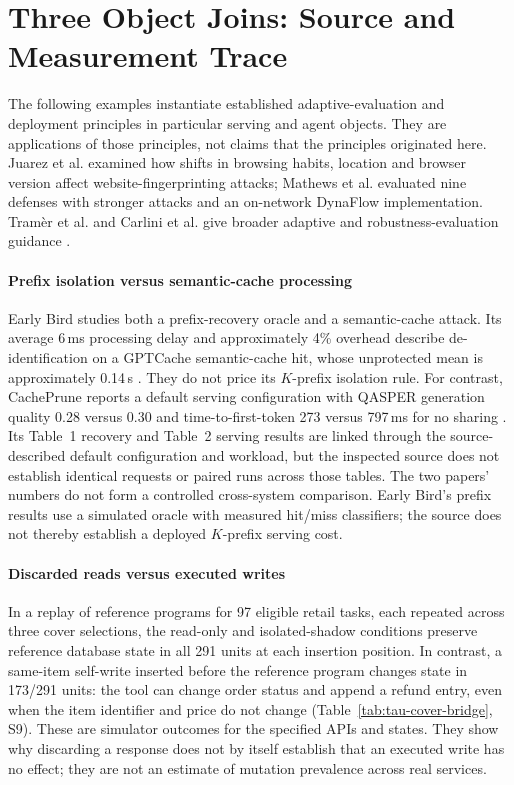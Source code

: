 \section{Three Object Joins: Source and Measurement Trace}\label{sec:object-join-evidence}
The following examples instantiate established adaptive-evaluation and deployment principles in particular serving and agent objects. They are applications of those principles, not claims that the principles originated here. Juarez et al. examined how shifts in browsing habits, location and browser version affect website-fingerprinting attacks; Mathews et al. evaluated nine defenses with stronger attacks and an on-network DynaFlow implementation. Tram\`er et al. and Carlini et al. give broader adaptive and robustness-evaluation guidance \cite{juarez2014critical,mathews2023critical,tramer2020adaptive,carlini2019evaluating}.

\paragraph{Prefix isolation versus semantic-cache processing}
Early Bird studies both a prefix-recovery oracle and a semantic-cache attack. Its average 6\,ms processing delay and approximately 4\% overhead describe de-identification on a GPTCache semantic-cache hit, whose unprotected mean is approximately 0.14\,s \cite[V-A--B]{earlybird2025}. They do not price its $K$-prefix isolation rule. For contrast, CachePrune reports a default serving configuration with QASPER generation quality 0.28 versus 0.30 and time-to-first-token 273 versus 797\,ms for no sharing \cite[Table~2, 5.2--5.6]{wu2026cacheprune}. Its Table~1 recovery and Table~2 serving results are linked through the source-described default configuration and workload, but the inspected source does not establish identical requests or paired runs across those tables. The two papers' numbers do not form a controlled cross-system comparison. Early Bird's prefix results use a simulated oracle with measured hit/miss classifiers; the source does not thereby establish a deployed $K$-prefix serving cost.

\paragraph{Discarded reads versus executed writes}
In a replay of reference programs for 97 eligible retail tasks, each repeated across three cover selections, the read-only and isolated-shadow conditions preserve reference database state in all 291 units at each insertion position. In contrast, a same-item self-write inserted before the reference program changes state in 173/291 units: the tool can change order status and append a refund entry, even when the item identifier and price do not change (Table~\ref{tab:tau-cover-bridge}, S9). These are simulator outcomes for the specified APIs and states. They show why discarding a response does not by itself establish that an executed write has no effect; they are not an estimate of mutation prevalence across real services.

